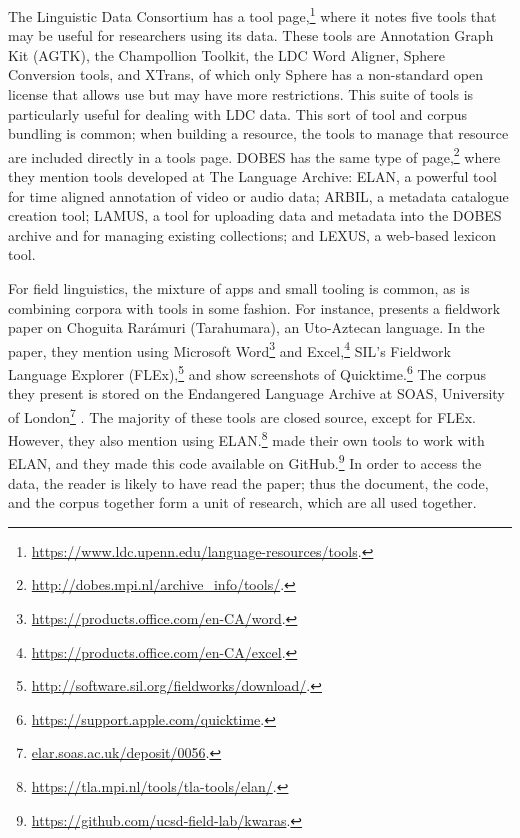 The Linguistic Data Consortium has a tool page,\footnote{\href{https://www.ldc.upenn.edu/language-resources/tools}{https://www.ldc.upenn.edu/language-resources/tools}. } where it notes five tools that may be useful for researchers using its data. These tools are Annotation Graph Kit (AGTK), the Champollion Toolkit, the LDC Word Aligner, Sphere Conversion tools, and XTrans, of which only Sphere has a non-standard open license that allows use but may have more restrictions. This suite of tools is particularly useful for dealing with LDC data. This sort of tool and corpus bundling is common; when building a resource, the tools to manage that resource are included directly in a tools page. DOBES has the same type of page,\footnote{\href{http://dobes.mpi.nl/archive_info/tools/}{http://dobes.mpi.nl/archive\_info/tools/}. } where they mention tools developed at The Language Archive: ELAN, a powerful tool for time aligned annotation of video or audio data; ARBIL, a metadata catalogue creation tool; LAMUS, a tool for uploading data and metadata into the DOBES archive and for managing existing collections; and LEXUS, a web-based lexicon tool. 

For field linguistics, the mixture of apps and small tooling is common, as is combining corpora with tools in some fashion. For instance, \citet{caballero2017choguita} presents a fieldwork paper on Choguita Rar\'amuri (Tarahumara), an Uto-Aztecan language. In the paper, they mention using Microsoft Word\footnote{\href{https://products.office.com/en-CA/word}{https://products.office.com/en-CA/word}. } and Excel,\footnote{\href{https://products.office.com/en-CA/excel}{https://products.office.com/en-CA/excel}. } SIL's Fieldwork Language Explorer (FLEx),\footnote{\href{http://software.sil.org/fieldworks/download/.}{http://software.sil.org/fieldworks/download/}. } and show screenshots of Quicktime.\footnote{\href{https://support.apple.com/quicktime}{https://support.apple.com/quicktime}. } The corpus they present is stored on the Endangered Language Archive at SOAS, University of London\footnote{\href{elar.soas.ac.uk/deposit/0056}{elar.soas.ac.uk/deposit/0056}. } \citep{caballero2009data}. The majority of these tools are closed source, except for FLEx. However, they also mention using ELAN.\footnote{\href{https://tla.mpi.nl/tools/tla-tools/elan/}{https://tla.mpi.nl/tools/tla-tools/elan/}. } \citet{caballero2017choguita} made their own tools to work with ELAN, and they made this code available on GitHub.\footnote{\href{https://github.com/ucsd-field-lab/kwaras}{https://github.com/ucsd-field-lab/kwaras}. } In order to access the data, the reader is likely to have read the paper; thus the document, the code, and the corpus together form a unit of research, which are all used together.

